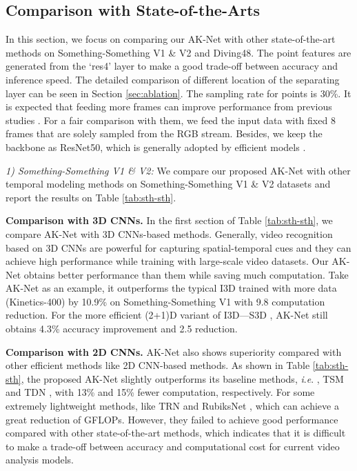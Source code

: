 \documentclass[journal]{IEEEtran}
\newcommand{\ie}{\textit{i}.\textit{e}. }
\begin{document}
\subsection{Comparison with State-of-the-Arts}
In this section, we focus on comparing our AK-Net with other state-of-the-art methods on Something-Something V1 \& V2 and Diving48.
The point features are generated from the `res4' layer to make a good trade-off between accuracy and inference speed.
The detailed comparison of different location of the separating layer can be seen in Section \ref{sec:ablation}.
The sampling rate  for points is 30\%.
It is expected that feeding more frames can improve performance from previous studies \cite{wang2021tdn, lin2019tsm}.
For a fair comparison with them, we feed the input data with fixed 8 frames that are solely sampled from the RGB stream.
Besides, we keep the backbone as ResNet50, which is generally adopted by efficient models \cite{lin2019tsm, li2020tea, liu2020teinet, wang2021tdn}.

\textit{1) Something-Something V1 \& V2:}
We compare our proposed AK-Net with other temporal modeling methods on Something-Something V1 \& V2 datasets and report the results on Table \ref{tab:sth-sth}.

\textbf{Comparison with 3D CNNs.}
In the first section of Table \ref{tab:sth-sth}, we compare AK-Net with 3D CNNs-based methods.
Generally, video recognition based on 3D CNNs are powerful for capturing spatial-temporal cues and they can achieve high performance while training with large-scale video datasets.
Our AK-Net obtains better performance than them while saving much computation.
Take AK-Net as an example, it outperforms the typical I3D \cite{carreira2017quo} trained with more data (Kinetics-400) by 10.9\% on Something-Something V1 with 9.8 computation reduction.
For the more efficient (2+1)D variant of I3D---S3D \cite{xie2018rethinking}, AK-Net still obtains 4.3\% accuracy improvement and 2.5 reduction.

\textbf{Comparison with 2D CNNs.}
AK-Net also shows superiority compared with other efficient methods like 2D CNN-based methods.
As shown in Table \ref{tab:sth-sth}, the proposed AK-Net slightly outperforms its baseline methods, \ie, TSM \cite{lin2019tsm} and TDN \cite{wang2021tdn}, with 13\% and 15\% fewer computation, respectively.
For some extremely lightweight methods, like TRN \cite{zhou2018temporal} and RubiksNet \cite{fan2020rubiksnet}, which can achieve a great reduction of GFLOPs.
However, they failed to achieve good performance compared with other state-of-the-art methods, which indicates that it is difficult to make a trade-off between accuracy and computational cost for current video analysis models.
\end{document}
